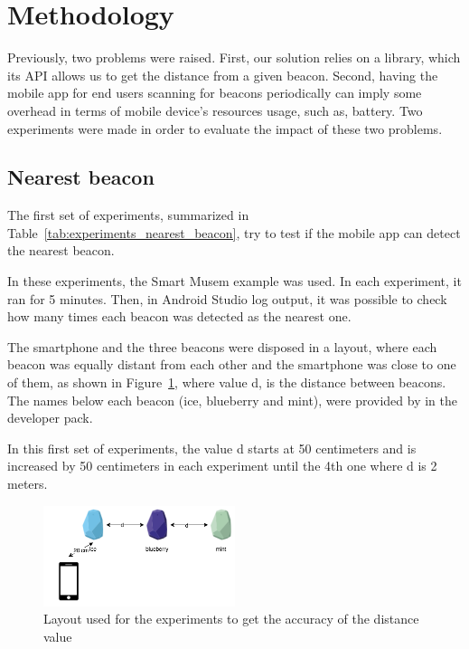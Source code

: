 \section{Methodology}
\label{sec:methodology}
Previously, two problems were raised. First, our solution relies on a library, which its \gls{API} allows us to get the distance from a given beacon.
Second, having the mobile app for end users scanning for beacons periodically can imply some overhead in terms of mobile device's resources usage, such as, battery.
Two experiments were made in order to evaluate the impact of these two problems.

\subsection{Nearest beacon}
\label{sub:methodology_nearest_beacon}
The first set of experiments, summarized in Table~\ref{tab:experiments_nearest_beacon}, try to test if the mobile app can detect the nearest beacon.



In these experiments, the Smart Musem example was used.
In each experiment, it ran for 5 minutes. Then, in Android Studio log output, it was possible to check how many times each beacon was detected as the nearest one.

The smartphone and the three beacons were disposed in a layout, where each beacon was equally distant from each other and the smartphone was close to one of them, as shown in Figure~\ref{fig:layout_experiments_nearest_beacon}, where value d, is the distance between beacons.
The names below each beacon (ice, blueberry and mint), were provided by  in the developer pack.

In this first set of experiments, the value d starts at 50 centimeters and is increased by 50 centimeters in each experiment until the 4th one where d is 2 meters.

\begin{figure}[!ht]
  \centering
    \includegraphics[width=0.5\textwidth, keepaspectratio]{images/nearest_beacon}
    \caption[Layout for experiments of nearest beacon]{Layout used for the experiments to get the accuracy of the distance value}
    \label{fig:layout_experiments_nearest_beacon}
\end{figure}

